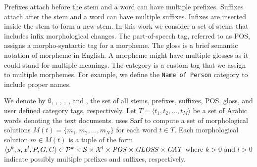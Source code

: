 Prefixes attach before the stem and a word can have multiple prefixes. 
Suffixes attach after the stem and a word can have multiple suffixes. 
Infixes are inserted inside the stem to form a new stem. 
In this work we consider a set of stems that includes infix morphological changes. 
The part-of-speech tag, referred to as POS, 
assigns a morpho-syntactic tag for a morpheme. 
The gloss is a brief semantic notation of morpheme in English. 
A morpheme might have multiple glosses as it could stand for multiple meanings. 
The category is a custom tag that we assign to multiple morphemes. 
For example, we define the {\tt Name of Person} category to include proper names.

We denote by 
\ss,
\pp,
\xx,
\PP,
\GG, and 
\AC, the set of 
all stems,
prefixes,
suffixes,
POS,
gloss, 
and user defined category tags, respectively. 
Let $T=\langle t_1,t_2,\ldots,t_M\rangle$ be a set of Arabic words denoting the 
text documents. 
\framework uses Sarf to compute a set of morphological solutions $M(t)=\{m_1,m_2,\ldots,m_N\}$
for each word $t\in T$. 
Each morphological solution $m\in M(t)$ is a tuple of the form 
$\langle p^k,s,x^l,P,G,C\rangle\in \pp^k \times  \ss\times \xx^l\times \PP\times\GG \times \AC$ where $k>0$ and $l>0$ indicate possibly multiple prefixes and suffixes, respectively.

\begin{table}[tb!]
  \centering
  \caption{Sample solution vector for .}
  \label{tab:samplesolution}%
\end{table}%

